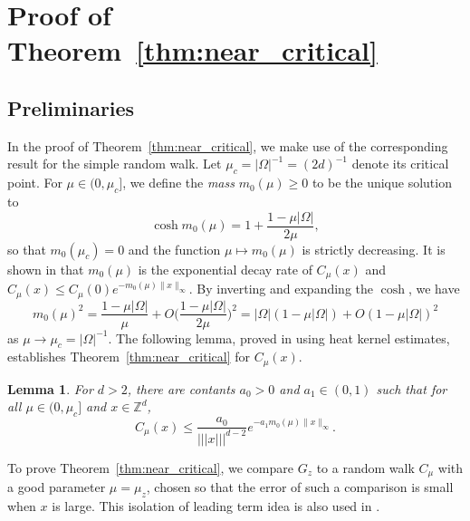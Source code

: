 \documentclass[11pt,hidelinks]{article}
\theoremstyle{plain}
\newtheorem{lemma}[theorem]{Lemma}
\numberwithin{equation}{section}
\newcommand{\Z}{\mathbb{Z}}
\newcommand{\inv}{^{-1}}
\renewcommand{\(}{\left(}
\renewcommand{\)}{\right)}
\newcommand{\1}{\mathds{1}}
\providecommand{\abs}[1]{\lvert#1\rvert}
\providecommand{\norm}[1]{\lVert#1\rVert}
\newcommand{\veee}[1]{|\!|\!|#1|\!|\!|}
\providecommand{\nnnorm}[1]{\veee {#1} }
\begin{document}
\section{Proof of Theorem~\ref{thm:near_critical}}
\label{sec:near_critical}

\subsection{Preliminaries}
In the proof of Theorem~\ref{thm:near_critical}, we make use of the corresponding result for the simple random walk. 
Let $\mu_c = \abs\Omega\inv = (2d)\inv$ denote its critical point. 
For $\mu \in (0, \mu_c]$, we define the \emph{mass} $m_0(\mu) \ge 0$ to be the unique solution to 
\begin{equation} \label{eq:m0_def}
\cosh m_0(\mu) = 1 + \frac{ 1 - \mu\abs\Omega }{ 2\mu }, 
\end{equation}
so that $m_0(\mu_c) = 0$ and the function $\mu \mapsto m_0(\mu)$ is strictly decreasing. 
It is shown in \cite[Theorem~A.2]{MS93} that $m_0(\mu)$ is the exponential decay rate of $C_\mu(x)$ and $C_\mu(x) \le C_\mu(0) e^{-m_0(\mu) \norm x_\infty}$. 
By inverting and expanding the $\cosh$, we have
\begin{equation}
\label{eq:m0}
m_0(\mu)^2 = \frac{ 1 - \mu \abs\Omega }{ \mu } + O \bigg(\frac{ 1-\mu\abs\Omega}{2\mu} \bigg)^2 
= \abs\Omega ( 1 - \mu \abs\Omega ) + O (1-\mu\abs\Omega)^2 
\end{equation}
as $\mu \to \mu_c = \abs\Omega\inv$.
The following lemma, proved in \cite[Proposition~2.1]{Slad23_wsaw} using heat kernel estimates,
establishes Theorem~\ref{thm:near_critical} for $C_\mu(x)$.

\begin{lemma}
\label{lem:C}
For $d>2$, there are contants $a_0 > 0$ and $a_1 \in (0,1)$ such that for all $\mu \in (0, \mu_c]$ and $x\in \Z^d$,
\begin{equation}\label{eq:Cmu_bd}
C_\mu(x) \le \frac{ a_0 }{ \nnnorm x^{d-2} } e^{-a_1 m_0(\mu) \norm x _ \infty}.
\end{equation}
\end{lemma}



To prove Theorem~\ref{thm:near_critical}, we compare $G_z$ to a random walk $C_\mu$ with a good parameter $\mu = \mu_z$, chosen so that the error of such a comparison is small when $x$ is large. 
This isolation of leading term idea is also used in \cite{Slad23_wsaw, LS24a}.
\end{document}
